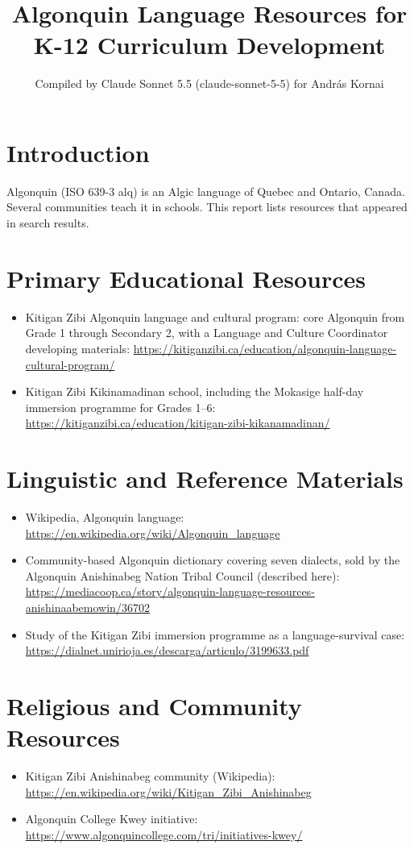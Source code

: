 \documentclass[12pt]{article}
\title{Algonquin Language Resources for K-12 Curriculum Development}
\author{Compiled by Claude Sonnet 5.5 (claude-sonnet-5-5) for Andr\'as Kornai}
\date{}
\begin{document}
\maketitle

\section{Introduction}
Algonquin (ISO 639-3 alq) is an Algic language of Quebec and Ontario, Canada. Several communities teach it in schools. This report lists resources that appeared in search results.

\section{Primary Educational Resources}
\begin{itemize}
\item Kitigan Zibi Algonquin language and cultural program: core Algonquin from Grade 1 through Secondary 2, with a Language and Culture Coordinator developing materials: \url{https://kitiganzibi.ca/education/algonquin-language-cultural-program/}
\item Kitigan Zibi Kikinamadinan school, including the Mokasige half-day immersion programme for Grades 1--6: \url{https://kitiganzibi.ca/education/kitigan-zibi-kikanamadinan/}
\end{itemize}

\section{Linguistic and Reference Materials}
\begin{itemize}
\item Wikipedia, Algonquin language: \url{https://en.wikipedia.org/wiki/Algonquin_language}
\item Community-based Algonquin dictionary covering seven dialects, sold by the Algonquin Anishinabeg Nation Tribal Council (described here): \url{https://mediacoop.ca/story/algonquin-language-resources-anishinaabemowin/36702}
\item Study of the Kitigan Zibi immersion programme as a language-survival case: \url{https://dialnet.unirioja.es/descarga/articulo/3199633.pdf}
\end{itemize}

\section{Religious and Community Resources}
\begin{itemize}
\item Kitigan Zibi Anishinabeg community (Wikipedia): \url{https://en.wikipedia.org/wiki/Kitigan_Zibi_Anishinabeg}
\item Algonquin College Kwey initiative: \url{https://www.algonquincollege.com/tri/initiatives-kwey/}
\end{itemize}
\end{document}
